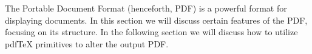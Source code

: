 
The Portable Document Format (henceforth, PDF) is a powerful format for displaying documents.
In this section we will discuss certain features of the PDF, focusing on its structure.
In the following section we will discuss how to utilize pdf\TeX{} primitives to alter the output PDF.

